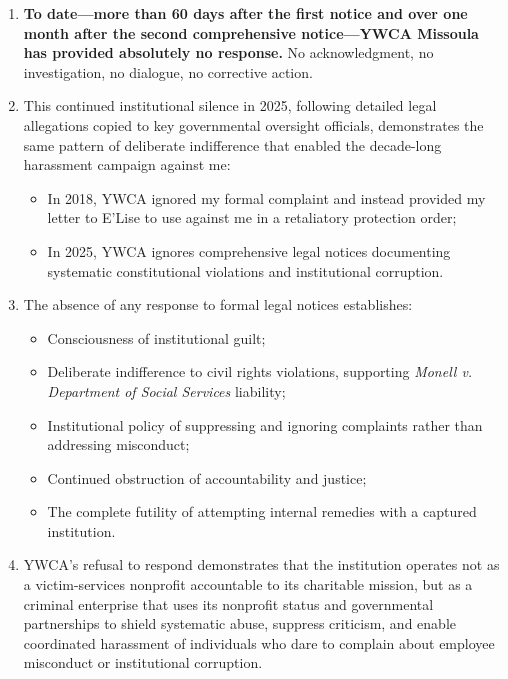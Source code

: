 \documentclass[12pt,letterpaper]{article}
\begin{document}
\begin{enumerate}
\item \textbf{To date---more than 60 days after the first notice and over one month after the second comprehensive notice---YWCA Missoula has provided absolutely no response.} No acknowledgment, no investigation, no dialogue, no corrective action.

\item This continued institutional silence in 2025, following detailed legal allegations copied to key governmental oversight officials, demonstrates the same pattern of deliberate indifference that enabled the decade-long harassment campaign against me:

\begin{itemize}
\item In 2018, YWCA ignored my formal complaint and instead provided my letter to E'Lise to use against me in a retaliatory protection order;

\item In 2025, YWCA ignores comprehensive legal notices documenting systematic constitutional violations and institutional corruption.
\end{itemize}

\item The absence of any response to formal legal notices establishes:

\begin{itemize}
\item Consciousness of institutional guilt;

\item Deliberate indifference to civil rights violations, supporting \textit{Monell v. Department of Social Services} liability;

\item Institutional policy of suppressing and ignoring complaints rather than addressing misconduct;

\item Continued obstruction of accountability and justice;

\item The complete futility of attempting internal remedies with a captured institution.
\end{itemize}

\item YWCA's refusal to respond demonstrates that the institution operates not as a victim-services nonprofit accountable to its charitable mission, but as a criminal enterprise that uses its nonprofit status and governmental partnerships to shield systematic abuse, suppress criticism, and enable coordinated harassment of individuals who dare to complain about employee misconduct or institutional corruption.

\end{enumerate}
\end{document}
